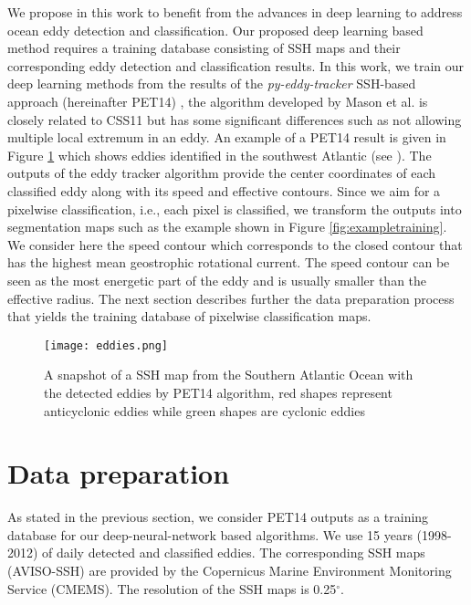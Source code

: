 \documentclass[journal]{IEEEtran}
\begin{document}
We propose in this work to benefit from the advances in deep learning to address ocean eddy detection and classification. Our proposed deep learning based method requires a training database consisting of SSH maps and their corresponding eddy detection and classification results. In this work, we train our deep learning methods from the results of the \textit{py-eddy-tracker} SSH-based approach (hereinafter PET14) \cite{mason2014new}, the algorithm developed by Mason et al. is closely related to CSS11 but has some significant differences such as not allowing multiple local extremum in an eddy. An example of a PET14 result is given in Figure \ref{fig:eddies} which shows eddies identified in the southwest Atlantic (see \cite{mason17}). 
% 
% 
The outputs of the eddy tracker algorithm provide the center coordinates of each classified eddy along with its speed and effective contours. Since we aim for a pixelwise classification, i.e., each pixel is classified, we transform the outputs into segmentation maps such as the example shown in Figure \ref{fig:exampletraining}. We consider here the speed contour which corresponds to the closed contour that has the highest mean geostrophic rotational current. The speed contour can be seen as the most energetic part of the eddy and is usually smaller than the effective radius. The next section describes further the data preparation process that yields the training database of pixelwise classification maps.

\begin{figure}[t]
\centering
\texttt{[image: eddies.png]}
\caption{A snapshot of a SSH map from the Southern Atlantic Ocean with the detected eddies by PET14 algorithm, red shapes represent anticyclonic eddies while green shapes are cyclonic eddies}
\label{fig:eddies}
\end{figure}

\section{Data preparation}

As stated in the previous section, we consider PET14 outputs as a training database for our deep-neural-network based algorithms. We use 15 years (1998-2012) of daily detected and classified eddies. The corresponding SSH maps (AVISO-SSH) are provided by the Copernicus Marine Environment Monitoring Service (CMEMS). The resolution of the SSH maps is 0.25$^\circ$.
\end{document}
